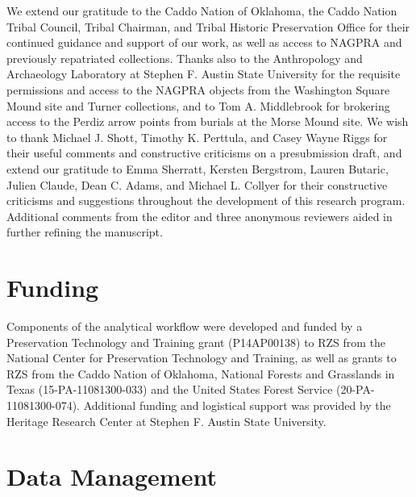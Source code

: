\documentclass[smallextended]{svjour3}       %
\begin{document}
We extend our gratitude to the Caddo Nation of Oklahoma, the Caddo
Nation Tribal Council, Tribal Chairman, and Tribal Historic Preservation
Office for their continued guidance and support of our work, as well as
access to NAGPRA and previously repatriated collections. Thanks also to
the Anthropology and Archaeology Laboratory at Stephen F. Austin State
University for the requisite permissions and access to the NAGPRA
objects from the Washington Square Mound site and Turner collections,
and to Tom A. Middlebrook for brokering access to the Perdiz arrow
points from burials at the Morse Mound site. We wish to thank Michael J.
Shott, Timothy K. Perttula, and Casey Wayne Riggs for their useful
comments and constructive criticisms on a presubmission draft, and
extend our gratitude to Emma Sherratt, Kersten Bergstrom, Lauren
Butaric, Julien Claude, Dean C. Adams, and Michael L. Collyer for their
constructive criticisms and suggestions throughout the development of
this research program. Additional comments from the editor and three
anonymous reviewers aided in further refining the manuscript.

\hypertarget{funding}{%
\section*{Funding}\label{funding}}

Components of the analytical workflow were developed and funded by a
Preservation Technology and Training grant (P14AP00138) to RZS from the
National Center for Preservation Technology and Training, as well as
grants to RZS from the Caddo Nation of Oklahoma, National Forests and
Grasslands in Texas (15-PA-11081300-033) and the United States Forest
Service (20-PA-11081300-074). Additional funding and logistical support
was provided by the Heritage Research Center at Stephen F. Austin State
University.

\hypertarget{data-management}{%
\section*{Data Management}\label{data-management}}
\end{document}
